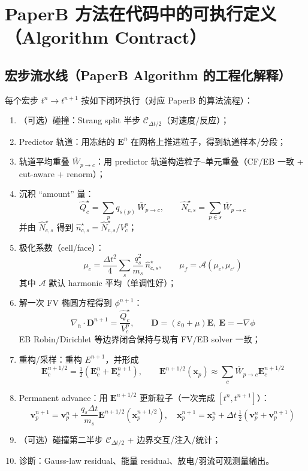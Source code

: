 \documentclass[UTF8,a4paper,12pt]{ctexart}
\newcommand{\dt}{\Delta t}
\begin{document}
\section{PaperB 方法在代码中的可执行定义（Algorithm Contract）}

\subsection{宏步流水线（PaperB Algorithm 的工程化解释）}
每个宏步 $t^n\to t^{n+1}$ 按如下闭环执行（对应 PaperB 的算法流程）：
\begin{enumerate}[leftmargin=2em]
  \item （可选）碰撞：Strang split 半步 $\mathcal{C}_{\dt/2}$（对速度/反应）；
  \item Predictor 轨道：用冻结的 $\bm{E}^n$ 在网格上推进粒子，得到轨道样本/分段；
  \item 轨道平均重叠 $\overline{W}_{p\to c}$：用 predictor 轨道构造粒子--单元重叠（CF/EB 一致 + cut-aware + renorm）；
  \item 沉积 ``amount'' 量：
  \[
    \widehat{Q}_c^\star=\sum_{p} q_{s(p)}\,\overline{W}_{p\to c},\qquad
    \widehat{N}_{c,s}^\star=\sum_{p\in s}\overline{W}_{p\to c}
  \]
  并由 $\widehat{N}_{c,s}^\star$ 得到 $\hat n_{c,s}^\star=\widehat{N}_{c,s}^\star/V_c^p$；
  \item 极化系数（cell/face）：
  \[
  \mu_c=\frac{\dt^2}{4}\sum_s\frac{q_s^2}{m_s}\,\hat n_{c,s}^\star,\qquad
  \mu_f=\mathcal{A}(\mu_c,\mu_{c'})
  \]
  其中 $\mathcal{A}$ 默认 harmonic 平均（单调性好）；
  \item 解一次 FV 椭圆方程得到 $\phi^{n+1}$：
  \[
  \nabla_h\cdot\bm{D}^{n+1}=\frac{\widehat{Q}_c^\star}{V_c^p},\qquad
  \bm{D}=(\varepsilon_0+\mu)\bm{E},\ \bm{E}=-\nabla\phi
  \]
  EB Robin/Dirichlet 等边界闭合保持与现有 FV/EB solver 一致；
  \item 重构/采样：重构 $E^{n+1}$，并形成
  \[
    \bm{E}^{n+1/2}_c=\tfrac12(\bm{E}^n_c+\bm{E}^{n+1}_c),\qquad
    \bm{E}^{n+1/2}(\bm{x}_p)\approx\sum_c \overline{W}_{p\to c}\bm{E}^{n+1/2}_c
  \]
  \item Permanent advance：用 $\bm{E}^{n+1/2}$ 更新粒子（一次完成 $[t^n,t^{n+1}]$）：
  \[
  \bm{v}_p^{n+1}=\bm{v}_p^{n}+\frac{q_s\dt}{m_s}\bm{E}^{n+1/2}(\bm{x}_p^{n+1/2}),\quad
  \bm{x}_p^{n+1}=\bm{x}_p^n+\dt\,\tfrac12(\bm{v}_p^n+\bm{v}_p^{n+1})
  \]
  \item （可选）碰撞第二半步 $\mathcal{C}_{\dt/2}$ + 边界交互/注入/统计；
  \item 诊断：Gauss-law residual、能量 residual、放电/羽流可观测量输出。
\end{enumerate}
\end{document}
